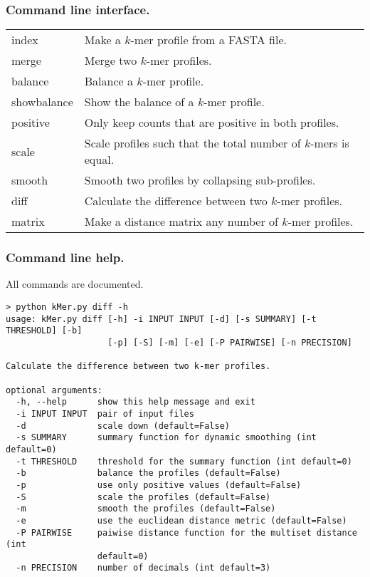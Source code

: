 \documentclass[slidestop]{beamer}
\begin{document}
\begin{frame}
  \frametitle{Command line interface.}

  \begin{tabular}{lp{7cm}}
    index       & Make a $k$-mer profile from a FASTA file.\\
    merge       & Merge two $k$-mer profiles.\\
    balance     & Balance a $k$-mer profile.\\
    showbalance & Show the balance of a $k$-mer profile.\\
    positive    & Only keep counts that are positive in both profiles.\\
    scale       & Scale profiles such that the total number of $k$-mers is 
      equal.\\
    smooth      & Smooth two profiles by collapsing sub-profiles.\\
    diff        & Calculate the difference between two $k$-mer profiles.\\
    matrix      & Make a distance matrix any number of $k$-mer profiles.\\
  \end{tabular}
\end{frame}

\begin{frame}[fragile]
  \frametitle{Command line help.}

  All commands are documented.
  \bigskip

  \begin{lstlisting}[numbers=none, basicstyle=\tiny, caption={Help for the
     diff option.}, language=none]
> python kMer.py diff -h
usage: kMer.py diff [-h] -i INPUT INPUT [-d] [-s SUMMARY] [-t THRESHOLD] [-b]
                    [-p] [-S] [-m] [-e] [-P PAIRWISE] [-n PRECISION]

Calculate the difference between two k-mer profiles.

optional arguments:
  -h, --help      show this help message and exit
  -i INPUT INPUT  pair of input files
  -d              scale down (default=False)
  -s SUMMARY      summary function for dynamic smoothing (int default=0)
  -t THRESHOLD    threshold for the summary function (int default=0)
  -b              balance the profiles (default=False)
  -p              use only positive values (default=False)
  -S              scale the profiles (default=False)
  -m              smooth the profiles (default=False)
  -e              use the euclidean distance metric (default=False)
  -P PAIRWISE     paiwise distance function for the multiset distance (int
                  default=0)
  -n PRECISION    number of decimals (int default=3)

  \end{lstlisting}
\end{frame}
\end{document}
